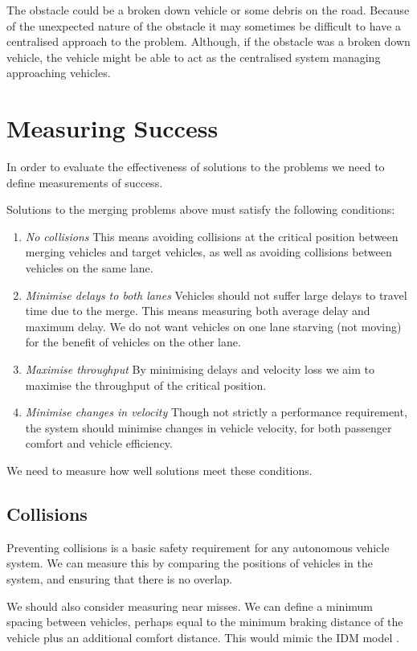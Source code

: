The obstacle could be a broken down vehicle or some debris on the road. Because of the unexpected nature of the obstacle it may sometimes be difficult to have a centralised approach to the problem. Although, if the obstacle was a broken down vehicle, the vehicle might be able to act as the centralised system managing approaching vehicles.

\section{Measuring Success}
\label{sec:Measuring Success}
In order to evaluate the effectiveness of solutions to the problems we need to define measurements of success. 

Solutions to the merging problems above must satisfy the following conditions:

\begin{enumerate}
\item \textit{No collisions}
This means avoiding collisions at the critical position between merging vehicles and target vehicles, as well as avoiding collisions between vehicles on the same lane.
\item \textit{Minimise delays to both lanes}
Vehicles should not suffer large delays to travel time due to the merge. This means measuring both average delay and maximum delay. We do not want vehicles on one lane starving (not moving) for the benefit of vehicles on the other lane.
\item \textit{Maximise throughput}
By minimising delays and velocity loss we aim to maximise the throughput of the critical position.
\item \textit{Minimise changes in velocity}
Though not strictly a performance requirement, the system should minimise changes in vehicle velocity, for both passenger comfort and vehicle efficiency.
\end{enumerate}

We need to measure how well solutions meet these conditions. 

\subsection{Collisions}
\label{subsec:Collisions}
Preventing collisions is a basic safety requirement for any autonomous vehicle system. We can measure this by comparing the positions of vehicles in the system, and ensuring that there is no overlap.

We should also consider measuring near misses. We can define a minimum spacing between vehicles, perhaps equal to the minimum braking distance of the vehicle plus an additional comfort distance. This would mimic the IDM model \citep{Treiber2000}.

